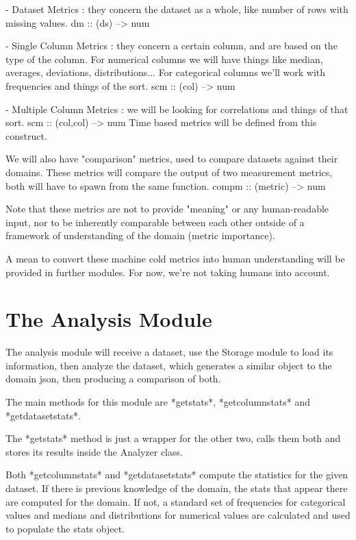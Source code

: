     - Dataset Metrics : they concern the dataset as a whole, like number of rows with missing values.
        dm :: (ds) --> num
        
    - Single Column Metrics : they concern a certain column, and are based on the type of the column.
        For numerical columns we will have things like median, averages, deviations, distributions...
        For categorical columns we'll work with frequencies and things of the sort.
        scm :: (col) --> num
        
    - Multiple Column Metrics : we will be looking for correlations and things of that sort.
        scm :: (col,col) --> num 
        Time based metrics will be defined from this construct.

We will also have "comparison" metrics, used to compare datasets against their domains.
These metrics will compare the output of two measurement metrics, both will have to
spawn from the same function.
    compm :: (metric) --> num

Note that these metrics are not to provide "meaning" or any human-readable input, nor to be
inherently comparable between each other outside of a framework of understanding of the domain
(metric importance).

A mean to convert these machine cold metrics into human understanding will be provided in further 
modules. For now, we're not taking humans into account.

\section{The Analysis Module}
\label{cap2:sec:analysis}

The analysis module will receive a dataset, use the Storage module to load its information, then analyze the dataset, which generates a similar object to the domain json, then producing a comparison of both.

The main methods for this module are *getstats*, *getcolumnstats* and *getdatasetstats*.

The *getstats* method is just a wrapper for the other two, calls them both and stores its results inside the Analyzer class.

Both *getcolumnstats* and *getdatasetstats* compute the statistics for the given dataset. If there is previous knowledge of the domain, the stats that appear there are computed for the domain. If not, a standard set of frequencies for categorical values and medians and distributions for numerical values are calculated and used to populate the stats object.

